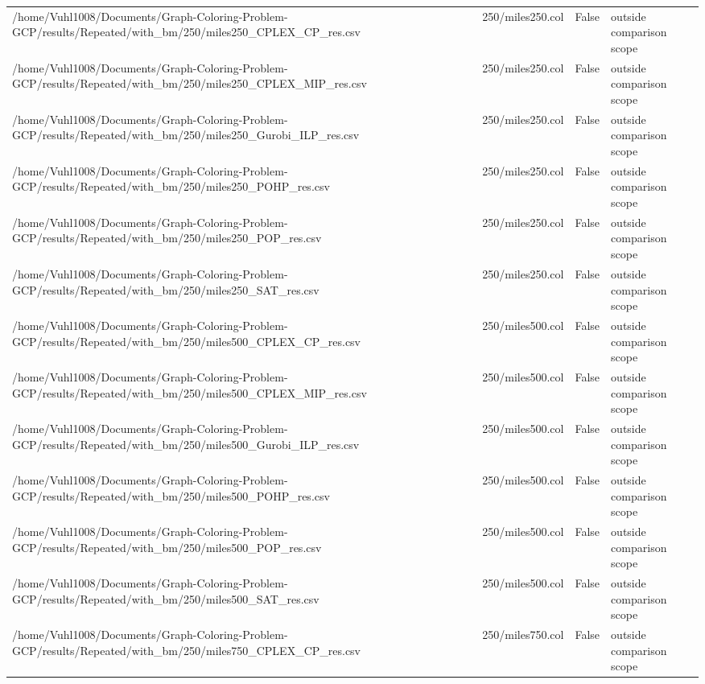 \begin{table}[htbp]
\begin{tabular}{llll}
/home/Vuhl1008/Documents/Graph-Coloring-Problem-GCP/results/Repeated/with\_bm/250/miles250\_CPLEX\_CP\_res.csv & 250/miles250.col & False & outside comparison scope \\
/home/Vuhl1008/Documents/Graph-Coloring-Problem-GCP/results/Repeated/with\_bm/250/miles250\_CPLEX\_MIP\_res.csv & 250/miles250.col & False & outside comparison scope \\
/home/Vuhl1008/Documents/Graph-Coloring-Problem-GCP/results/Repeated/with\_bm/250/miles250\_Gurobi\_ILP\_res.csv & 250/miles250.col & False & outside comparison scope \\
/home/Vuhl1008/Documents/Graph-Coloring-Problem-GCP/results/Repeated/with\_bm/250/miles250\_POHP\_res.csv & 250/miles250.col & False & outside comparison scope \\
/home/Vuhl1008/Documents/Graph-Coloring-Problem-GCP/results/Repeated/with\_bm/250/miles250\_POP\_res.csv & 250/miles250.col & False & outside comparison scope \\
/home/Vuhl1008/Documents/Graph-Coloring-Problem-GCP/results/Repeated/with\_bm/250/miles250\_SAT\_res.csv & 250/miles250.col & False & outside comparison scope \\
/home/Vuhl1008/Documents/Graph-Coloring-Problem-GCP/results/Repeated/with\_bm/250/miles500\_CPLEX\_CP\_res.csv & 250/miles500.col & False & outside comparison scope \\
/home/Vuhl1008/Documents/Graph-Coloring-Problem-GCP/results/Repeated/with\_bm/250/miles500\_CPLEX\_MIP\_res.csv & 250/miles500.col & False & outside comparison scope \\
/home/Vuhl1008/Documents/Graph-Coloring-Problem-GCP/results/Repeated/with\_bm/250/miles500\_Gurobi\_ILP\_res.csv & 250/miles500.col & False & outside comparison scope \\
/home/Vuhl1008/Documents/Graph-Coloring-Problem-GCP/results/Repeated/with\_bm/250/miles500\_POHP\_res.csv & 250/miles500.col & False & outside comparison scope \\
/home/Vuhl1008/Documents/Graph-Coloring-Problem-GCP/results/Repeated/with\_bm/250/miles500\_POP\_res.csv & 250/miles500.col & False & outside comparison scope \\
/home/Vuhl1008/Documents/Graph-Coloring-Problem-GCP/results/Repeated/with\_bm/250/miles500\_SAT\_res.csv & 250/miles500.col & False & outside comparison scope \\
/home/Vuhl1008/Documents/Graph-Coloring-Problem-GCP/results/Repeated/with\_bm/250/miles750\_CPLEX\_CP\_res.csv & 250/miles750.col & False & outside comparison scope \\

\end{tabular}
\end{table}
